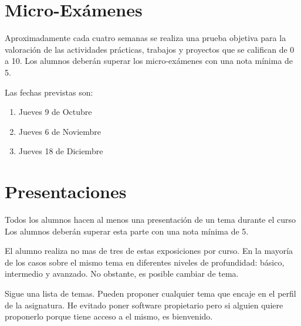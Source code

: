 \documentclass[11pt,a4paper]{article}
\begin{document}
\section{Micro-Exámenes}
Aproximadamente cada cuatro semanas se realiza una prueba objetiva para la valoración de las actividades prácticas,
trabajos y proyectos que se califican de 0 a 10. 
Los alumnos deberán superar los micro-exámenes con una nota mínima de 5. 

Las fechas previstas son:


\begin{enumerate}
\item
Jueves 9 de Octubre
\item
Jueves 6 de Noviembre
\item
Jueves 18 de Diciembre
\end{enumerate}
\section{Presentaciones}

Todos los alumnos hacen al menos una presentación de un tema durante el curso Los 
alumnos deberán superar esta parte con una nota mínima de 5. 

El alumno realiza no mas de tres de estas exposiciones por curso. 
En la mayoría de los casos sobre el mismo tema en diferentes niveles de profundidad: básico, intermedio y avanzado.
No obstante, es posible cambiar de tema.


Sigue una lista de temas. Pueden proponer cualquier tema que encaje en el perfil de la asignatura. He evitado poner software propietario pero si alguien quiere proponerlo porque tiene acceso a el mismo, es bienvenido.
\end{document}
